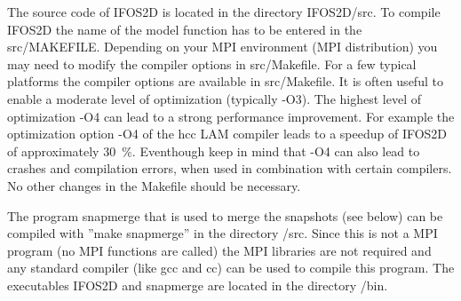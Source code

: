 The source code of IFOS2D is located in the directory IFOS2D/src. To compile IFOS2D the name of the model function has to be entered in the src/MAKEFILE. Depending on your MPI environment (MPI distribution) you may need to modify the compiler options in src/Makefile. For a few typical platforms the compiler options are available in src/Makefile. It is often useful to enable a moderate level of optimization (typically -O3). The highest level of optimization -O4 can lead to a strong performance improvement. For example the optimization option -O4 of the hcc LAM compiler leads to a speedup of IFOS2D of approximately 30~\%. Eventhough keep in mind that -O4 can also lead to crashes and compilation errors, when used in combination with certain compilers. No other changes in the Makefile should be necessary. 
{\color{blue}{\begin{verbatim}
# Makefile for IFOS2D

#--------------------------------------------------------
# edit here:

# source code for model generation

#MODEL = hh.c
MODEL = ../genmod/1D_linear_gradient_visc.c
MODEL_AC = ../genmod/1D_linear_gradient_ac.c
MODEL_EL = ../genmod/1D_linear_gradient_el.c
MODEL_VAC = ../genmod/1D_linear_gradient_viscac.c
EXEC= ../bin

# Description:
# CC = Compiler
# LFLAGS = Linker flag
# CFLAGS = Compiler flag

# LINUX with OpenMPI / IntelMPI and INTEL Compiler
# Use icc whenever possible, this will be much faster than gcc
CC=mpiicc
LFLAGS=-lm -lcseife -lstfinv -laff -lfourierxx -lfftw3 -lstdc++
CFLAGS=-O3
SFLAGS=-L./../contrib/libcseife -L./../contrib/bin
IFLAGS=-I./../contrib/libcseife -I./../contrib/header -I.

# LINUX with OpenMPI / IntelMPI and GCC Compiler
#CC=mpicc
#LFLAGS=-lm -lcseife -lstfinv -laff -lfourierxx -lfftw3 -lstdc++
#CFLAGS=-O3
#SFLAGS=-L./../contrib/libcseife -L./../contrib/bin
#IFLAGS=-I./../contrib/libcseife -I./../contrib/header -I.


# after this line, no further editing should be necessary
# --------------------------------------------------------
\end{verbatim}}} 

The program snapmerge that is used to merge the snapshots (see below) can be compiled with ''make snapmerge'' in the directory /src. Since this is not a MPI program (no MPI functions are called) the MPI libraries are not required and any standard compiler (like gcc and cc) can be used to compile this program. The executables IFOS2D and snapmerge are located in the directory /bin. 


